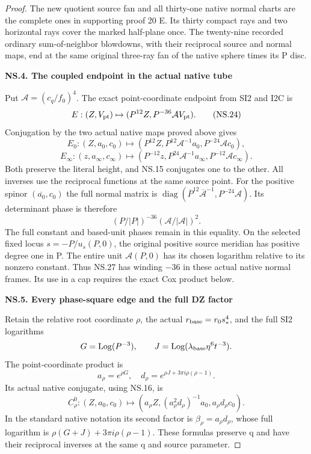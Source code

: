 \begin{proof}
The new quotient source fan and all thirty-one native normal charts
are the complete ones in supporting proof 20 E.  Its thirty compact
rays and two horizontal rays cover the marked half-plane once.  The
twenty-nine recorded ordinary sum-of-neighbor blowdowns, with their
reciprocal source and normal maps, end at the same original three-ray
fan of the native sphere times its P disc.

\par

\medskip\noindent\textbf{NS.4. The coupled endpoint in the actual native tube}

\par\nobreak

Put \(\mathcal A=(c_q/f_0)^4\). The exact point-coordinate endpoint
from SI2 and I2C is
\[
 E:(Z,V_{\rm pt})\mapsto(P^{12}Z,P^{-36}\mathcal A V_{\rm pt}).
 \tag{NS.24}
\]
Conjugation by the two actual native maps proved above gives
\[
 E_0:(Z,a_0,c_0)\mapsto
 (P^{12}Z,P^{12}\mathcal A^{-1}a_0,P^{-24}\mathcal A c_0),
 \tag{NS.25}
\]
\[
 E_\infty:(z,a_\infty,c_\infty)\mapsto
 (P^{-12}z,P^{24}\mathcal A^{-1}a_\infty,
                         P^{-12}\mathcal A c_\infty).
 \tag{NS.26}
\]
Both preserve the literal height, and NS.15 conjugates one to the
other. All inverses use the reciprocal functions at the same source
point. For the positive spinor \((\overline{a_0},c_0)\) the full
normal matrix is
\(\operatorname{diag}(\overline{P}^{12}\overline{\mathcal A}^{-1},
P^{-24}\mathcal A)\). Its determinant phase is therefore
\[
             (P/|P|)^{-36}(\mathcal A/|\mathcal A|)^2.
 \tag{NS.27}
\]
The full constant and based-unit phases remain in this equality.
On the selected fixed locus \(s=-P/u_s(P,0)\), the original positive
source meridian has positive degree one in P. The entire unit
\(\mathcal A(P,0)\) has its chosen logarithm relative to its nonzero
constant. Thus NS.27 has winding \(-36\) in these actual native
normal frames. Its use in a cap requires the exact Cox product below.

\par

\medskip\noindent\textbf{NS.5. Every phase-square edge and the full DZ factor}

\par\nobreak

Retain the relative root coordinate \(\rho\), the actual
\(r_{\rm base}=r_0s_*^4\), and the full SI2 logarithms
\[
 G=\operatorname{Log}(P^{-3}),\qquad
 J=\operatorname{Log}(\lambda_{\rm base}\eta^6t^{-3}).
\]
The point-coordinate product is
\[
 a_\rho=e^{\rho G},\quad
 d_\rho=e^{\rho J+3\pi i\rho(\rho-1)}.
 \tag{NS.28}
\]
Its actual native conjugate, using NS.16, is
\[
 C^0_\rho:(Z,a_0,c_0)\mapsto
 (a_\rho Z,(a_\rho^2d_\rho)^{-1}a_0,a_\rho d_\rho c_0).
 \tag{NS.29}
\]
In the standard native notation its second factor is
\(\beta_\rho=a_\rho d_\rho\), whose full logarithm is
\(\rho(G+J)+3\pi i\rho(\rho-1)\). These formulas preserve q
and have their reciprocal inverses at the same q and source parameter.


\end{proof}
